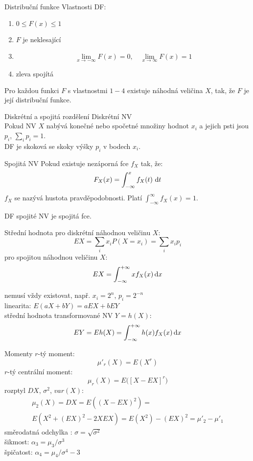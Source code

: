 \documentclass[smaller]{beamer}
\def\to{\rightarrow}
\def\d{\,{\rm d}}               %
\def\dt{\,\d t}
\def\blue#1{{\usebeamercolor[fg]{my blue} #1}}
\def\xskip{{\vspace{2ex}}}
\begin{document}
\begin{frame}{Distribuční funkce}
Vlastnosti DF: 
\begin{enumerate}
 \item $0\le F(x) \le 1$
 \item $F$ je neklesající
 \item \[
  \lim_{x\to -\infty} F(x) = 0,\quad \lim_{x\to \infty} F(x) = 1
\]
 \item zleva spojítá 
\end{enumerate}

\begin{theorem}
  Pro každou funkci $F$ s vlastnostmi $1-4$ existuje náhodná veličina $X$, tak, že $F$ je její distribuční funkce.
\end{theorem}

\end{frame}



\begin{frame}{Diskrétní a spojitá rozdělení}
\blue{Diskrétní NV}\\
Pokud NV $X$ nabývá konečné nebo spočetné množiny hodnot $x_i$ a jejich psti jsou $p_i$, $\sum_i p_i =1$.\\
DF je skoková se skoky výšky $p_i$ v bodech $x_i$.

\xskip
\blue{Spojitá NV}
Pokud existuje nezáporná fce $f_X$ tak, že:
\[
   F_X(x) = \int_{-\infty}^x f_X(t) \dt
\]
$f_X$ se nazývá \blue{hustota pravděpodobnosti}. Platí $\int_{-\infty}^{\infty} f_X(x) = 1$.

DF spojité NV je spojitá fce. 

\end{frame}

\begin{frame}{Střední hodnota}
pro diskrétní náhodnou veličinu $X$:
\[
  EX = \sum_i x_i P(X = x_i) = \sum_i x_i p_i
\]
pro spojitou náhodnou veličinu $X$:
\[
  EX = \int_{-\infty}^{+\infty} xf_X(x) \d x
\]

\xskip
nemusí vždy existovat, např. $x_i = 2^n$, $p_i = 2^{-n}$\\
linearita: $E(aX+bY) = aEX + bEY$\\
střední hodnota transformované NV $Y = h(X)$: 
\[
 EY =  E h(X) = \int_{-\infty}^{+\infty} h(x) f_X(x) \d x
\]

\end{frame}

\begin{frame}{Momenty}
$r$-tý moment:
\[
 \mu'_r(X) = E(X^r)
\]
$r$-tý centrální moment: 
\[
 \mu_r(X) = E\big([X - EX]^r\big)
\] 
rozptyl $DX$, $\sigma^2$, $var(X)$: 
\begin{multline*}
  \mu_2(X) = DX = E( (X-EX)^2 ) = \\
E( X^2 + (EX)^2 - 2X EX) = E(X^2) - (EX)^2 = \mu'_2 - \mu'_1
\end{multline*}
směrodatná odchylka : $\sigma = \sqrt{\sigma^2}$\\
šikmost: $\alpha_3 = \mu_3/\sigma^3$\\
špičatost: $\alpha_4 = \mu_4/\sigma^4 -3$
\end{frame}
\end{document}
